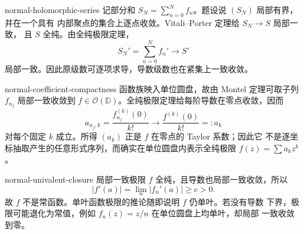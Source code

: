 \begin{solution}{normal-holomorphic-series}
记部分和 $S_N=\sum_{n=0}^Nf_n$。题设说 $(S_N)$ 局部有界，并在一个具有
内部聚点的集合上逐点收敛。Vitali--Porter 定理给 $S_N\to S$ 局部一致，
且 $S$ 全纯。由全纯极限定理，
\[
 S_N'=\sum_{n=0}^N f_n'\longrightarrow S'
\]
局部一致。因此原级数可逐项求导，导数级数也在紧集上一致收敛。
\end{solution}

\begin{solution}{normal-coefficient-compactness}
函数族映入单位圆盘，故由 Montel 定理可取子列 $f_{n_j}$ 局部一致收敛到
$f\in\mathcal O(\mathbb D)$。全纯极限定理给每阶导数在零点收敛，因而
\[
 a_{n_j,k}=\frac{f_{n_j}^{(k)}(0)}{k!}
 \longrightarrow \frac{f^{(k)}(0)}{k!}=:a_k
\]
对每个固定 $k$ 成立。所得 $(a_k)$ 正是 $f$ 在零点的 Taylor 系数；因此它
不是逐坐标抽取产生的任意形式序列，而确实在单位圆盘内表示全纯极限
$f(z)=\sum a_kz^k$。
\end{solution}

\begin{solution}{normal-univalent-closure}
局部一致极限 $f$ 全纯，且导数也局部一致收敛，所以
\[
 |f'(a)|=\lim_n|f_n'(a)|\ge c>0.
\]
故 $f$ 不是常函数。单叶函数极限的推论随即说明 $f$ 仍单叶。若没有导数
下界，极限可能退化为常值，例如 $f_n(z)=z/n$ 在单位圆盘上均单叶，却局部
一致收敛到零。
\end{solution}
